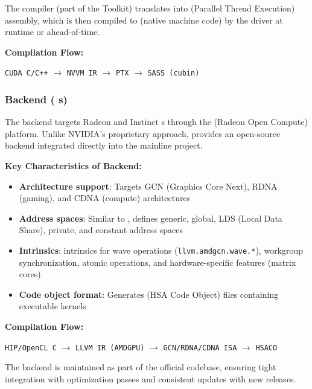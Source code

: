 The  compiler (part of the  Toolkit) translates   into  (Parallel Thread Execution) assembly, which is then compiled to  (native  machine code) by the  driver at runtime or ahead-of-time.

\textbf{Compilation Flow:}
\begin{center}
\texttt{CUDA C/C++} $\rightarrow$ \texttt{NVVM IR} $\rightarrow$ \texttt{PTX} $\rightarrow$ \texttt{SASS (cubin)}
\end{center}

\subsubsection{ Backend ( s)}

The  backend targets  Radeon and Instinct s through the  (Radeon Open Compute) platform. Unlike NVIDIA's proprietary  approach,  provides an open-source  backend integrated directly into the mainline  project.

\textbf{Key Characteristics of  Backend:}

\begin{itemize}[noitemsep]
  \item \textbf{Architecture support}: Targets GCN (Graphics Core Next), RDNA (gaming), and CDNA (compute) architectures
  \item \textbf{Address spaces}: Similar to , defines generic, global, LDS (Local Data Share), private, and constant address spaces
  \item \textbf{Intrinsics}:  intrinsics for wave operations (\texttt{llvm.amdgcn.wave.*}), workgroup synchronization, atomic operations, and hardware-specific features (matrix cores)
  \item \textbf{Code object format}: Generates  (HSA Code Object) files containing executable kernels
\end{itemize}

\textbf{Compilation Flow:}
\begin{center}
\texttt{HIP/OpenCL C} $\rightarrow$ \texttt{LLVM IR (AMDGPU)} $\rightarrow$ \texttt{GCN/RDNA/CDNA ISA} $\rightarrow$ \texttt{HSACO}
\end{center}

The  backend is maintained as part of the official  codebase, ensuring tight integration with  optimization passes and consistent updates with new  releases.

